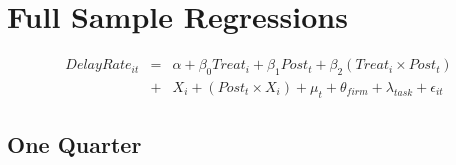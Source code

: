 \documentclass[
]{article}
\begin{document}
\hypertarget{full-sample-regressions}{%
\section{Full Sample Regressions}\label{full-sample-regressions}}

\[ \begin{aligned} DelayRate_{it} &=& \alpha+\beta_0 Treat_i + \beta_1 Post_t + \beta_2 (Treat_i \times Post_t)\\
&+&  X_i + (Post_t \times X_i) + \mu_t + \theta_{firm} + \lambda_{task}+ \epsilon_{it}
\end{aligned}\]

\hypertarget{one-quarter}{%
\subsection{One Quarter}\label{one-quarter}}
\end{document}
